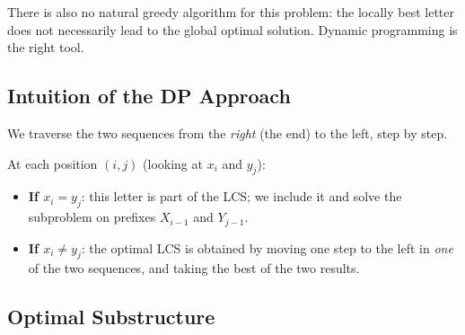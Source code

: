 There is also no natural greedy algorithm for this problem:
the locally best letter does not necessarily lead to the global optimal
solution. Dynamic programming is the right tool.

\subsection{Intuition of the DP Approach}

We traverse the two sequences from the \emph{right} (the end) to the left,
step by step.

At each position $(i, j)$ (looking at $x_i$ and $y_j$):
\begin{itemize}
  \item \textbf{If $x_i = y_j$}: this letter is part of the LCS; we include it
        and solve the subproblem on prefixes $X_{i-1}$ and $Y_{j-1}$.
  \item \textbf{If $x_i \ne y_j$}: the optimal LCS is obtained by moving one step
        to the left in \emph{one} of the two sequences, and taking the best of the
        two results.
\end{itemize}

\begin{center}
\end{center}

\subsection{Optimal Substructure}

